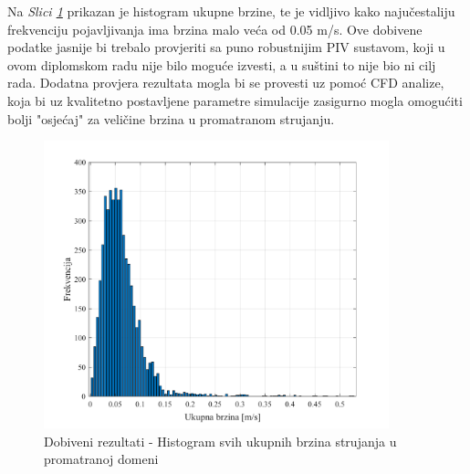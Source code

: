 \par
Na \textit{Slici \ref{sl:7.11}} prikazan je histogram ukupne brzine, te je vidljivo kako najučestaliju frekvenciju pojavljivanja ima brzina malo veća od 0.05 m/s. Ove dobivene podatke jasnije bi trebalo provjeriti sa puno robustnijim PIV sustavom, koji u ovom diplomskom radu nije bilo moguće izvesti, a u suštini to nije bio ni cilj rada. Dodatna provjera rezultata mogla bi  se provesti uz pomoć CFD analize, koja bi uz kvalitetno postavljene parametre simulacije zasigurno mogla omogućiti bolji "osjećaj" za veličine brzina u promatranom strujanju.
\begin{figure}[h]  
	\centering
	\includegraphics[width=10cm]{./7_LowCostPIV/slika7_11.pdf} 
	\caption{Dobiveni rezultati - Histogram svih ukupnih brzina strujanja u promatranoj domeni}
	\label{sl:7.11}
\end{figure}

